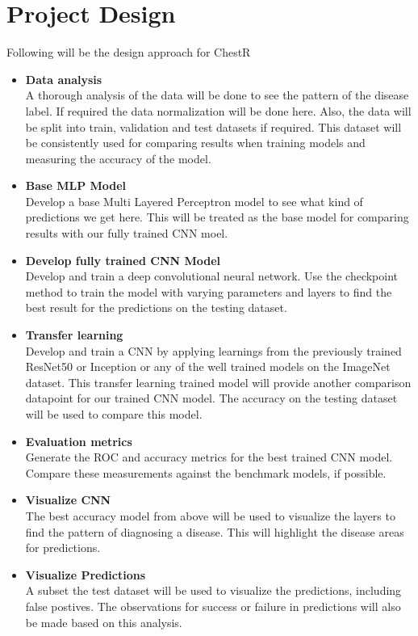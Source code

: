 \documentclass{article}
\begin{document}
    \section{Project Design}
    Following will be the design approach for ChestR
    \begin{itemize}
        \item \textbf{Data analysis} \\
            A thorough analysis of the data will be done to see the pattern of the disease label. If required the data normalization will be done here. Also, the data will be split into train, validation and test datasets if required. This dataset will be consistently used for comparing results when training models and measuring the accuracy of the model.
        \item \textbf{Base MLP Model} \\
            Develop a base Multi Layered Perceptron model to see what kind of predictions we get here. This will be treated as the base model for comparing results with our fully trained CNN moel.
        \item \textbf{Develop fully trained CNN Model} \\
            Develop and train a deep convolutional neural network. Use the checkpoint method to train the model with varying parameters and layers to find the best result for the predictions on the testing dataset.
        \item \textbf{Transfer learning} \\
            Develop and train a CNN by applying learnings from the previously trained ResNet50 or Inception or any of the well trained models on the ImageNet dataset. This transfer learning trained model will provide another comparison datapoint for our trained CNN model. The accuracy on the testing dataset will be used to compare this model.
        \item \textbf{Evaluation metrics} \\
            Generate the ROC and accuracy metrics for the best trained CNN model. Compare these measurements against the benchmark models, if possible.
        \item \textbf{Visualize CNN} \\
            The best accuracy model from above will be used to visualize the layers to find the pattern of diagnosing a disease. This will highlight the disease areas for predictions.
        \item \textbf{Visualize Predictions} \\
            A subset the test dataset will be used to visualize the predictions, including false postives. The observations for success or failure in predictions will also be made based on this analysis.
    \end{itemize}
    
\end{document}
